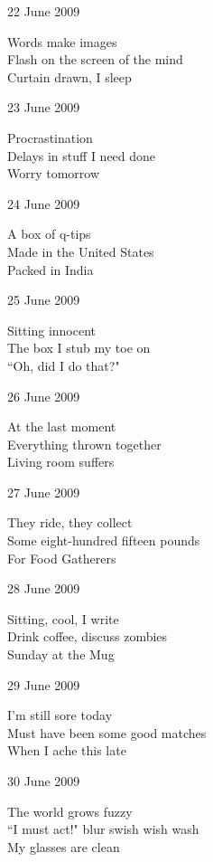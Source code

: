 \documentclass[12pt]{article}
\begin{document}
22 June 2009

Words make images \\
Flash on the screen of the mind \\
Curtain drawn, I sleep

23 June 2009

Procrastination \\
Delays in stuff I need done \\
Worry tomorrow


\newpage

24 June 2009

A box of q-tips \\
Made in the United States \\
Packed in India

25 June 2009

Sitting innocent \\
The box I stub my toe on \\
``Oh, did I do that?"

26 June 2009

At the last moment \\
Everything thrown together \\
Living room suffers

27 June 2009

They ride, they collect \\
Some eight-hundred fifteen pounds \\
For Food Gatherers

28 June 2009

Sitting, cool, I write \\
Drink coffee, discuss zombies \\
Sunday at the Mug

29 June 2009

I'm still sore today \\
Must have been some good matches \\
When I ache this late

30 June 2009

The world grows fuzzy \\
``I must act!" blur swish wish wash \\
My glasses are clean



\newpage
\end{document}

